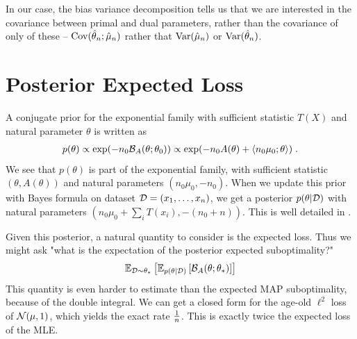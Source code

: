 \documentclass{article}
\newcommand*{\expect}[2][]{\ensuremath{\mathbb{E}_{#1} \left[ #2 \right] }} %
\newcommand{\logpart}{A}
\newcommand{\bregman}{\cB_\logpart}
\newcommand{\natp}{\theta}
\newcommand{\MAPm}{\hat \mu_n}
\newcommand{\MAPt}{\hat \natp_n}
\begin{document}
In our case, the bias variance decomposition tells us that we are interested in the covariance between primal and dual parameters, rather than the covariance of only of these -- $\Cov(\MAPt;\MAPm)$ rather that $\Var(\MAPm)$ or $\Var(\MAPt)$.

\section{Posterior Expected Loss}

A conjugate prior for the exponential family with sufficient statistic $T(X)$ and natural parameter $\natp$ is written as
\begin{align}
    p(\natp) 
    \propto \exp(-n_0 \bregman(\natp ; \natp_0)) 
    \propto \exp(-n_0 \logpart(\natp) + \langle n_0 \mu_0 ; \natp \rangle) \; .
\end{align}
We see that $p(\natp)$ is part of the exponential family, with sufficient statistic $(\natp, \logpart(\natp))$ and natural parameters $(n_0 \mu_0 , -n_0)$. When we update this prior with Bayes formula on dataset ${\mathcal D}=(x_1,\dots,x_n)$, we get a posterior $p(\natp | \cD)$ with natural parameters $(n_0 \mu_0 + \sum_i T(x_i) , -(n_0 + n))$. This is well detailed in \citet{agarwal2010geometric}. 

Given this posterior, a natural quantity to consider is the expected loss. Thus we might ask "what is the expectation of the posterior expected suboptimality?"
\begin{align}
    \expect[\cD\sim\natp_*]{\expect[p(\natp|\cD)]{\bregman(\natp ; \natp_*)}}
\end{align}
This quantity is even harder to estimate than the expected MAP suboptimality, because of the double integral. We can get a closed form for the age-old $\ell^2$ loss of ${\mathcal N}(\mu, 1)$, which yields the exact rate $\frac{1}{n}$. This is exactly twice the expected loss of the MLE.
\end{document}

